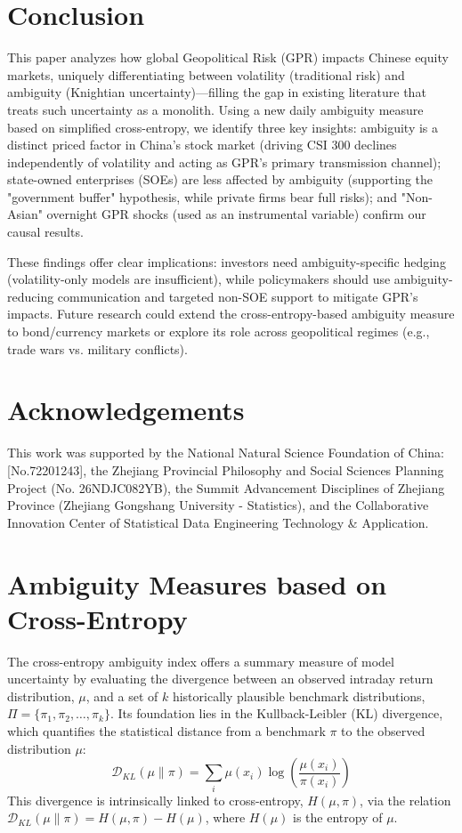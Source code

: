 \documentclass[preprint,12pt,authoryear]{elsarticle}
\begin{document}
\section{Conclusion}
\label{sec:conclusion}

This paper analyzes how global Geopolitical Risk (GPR) impacts Chinese equity markets, uniquely differentiating between volatility (traditional risk) and ambiguity (Knightian uncertainty)—filling the gap in existing literature that treats such uncertainty as a monolith. Using a new daily ambiguity measure based on simplified cross-entropy, we identify three key insights: ambiguity is a distinct priced factor in China’s stock market (driving CSI 300 declines independently of volatility and acting as GPR’s primary transmission channel); state-owned enterprises (SOEs) are less affected by ambiguity (supporting the "government buffer" hypothesis, while private firms bear full risks); and "Non-Asian" overnight GPR shocks (used as an instrumental variable) confirm our causal results.

These findings offer clear implications: investors need ambiguity-specific hedging (volatility-only models are insufficient), while policymakers should use ambiguity-reducing communication and targeted non-SOE support to mitigate GPR’s impacts. Future research could extend the cross-entropy-based ambiguity measure to bond/currency markets or explore its role across geopolitical regimes (e.g., trade wars vs. military conflicts).




\clearpage
\section*{Acknowledgements}
This work was supported by the National Natural Science Foundation of China:[No.72201243], the Zhejiang Provincial Philosophy and Social Sciences Planning Project (No. 26NDJC082YB), the Summit Advancement Disciplines of Zhejiang Province (Zhejiang Gongshang University - Statistics), and the Collaborative Innovation Center of Statistical Data Engineering Technology \& Application.

\appendix

\section{Ambiguity Measures based on Cross-Entropy}
The cross-entropy ambiguity index offers a summary measure of model uncertainty by evaluating the divergence between an observed intraday return distribution, $\mu$, and a set of $k$ historically plausible benchmark distributions, $\Pi = \{\pi_1, \pi_2, \dots, \pi_k\}$. Its foundation lies in the Kullback-Leibler (KL) divergence, which quantifies the statistical distance from a benchmark $\pi$ to the observed distribution $\mu$:
\begin{equation}
    \mathcal{D}_{KL}(\mu \| \pi) = \sum_{i} \mu(x_i) \log\left(\frac{\mu(x_i)}{\pi(x_i)}\right)
\end{equation}
This divergence is intrinsically linked to cross-entropy, $H(\mu, \pi)$, via the relation $\mathcal{D}_{KL}(\mu \| \pi) = H(\mu, \pi) - H(\mu)$, where $H(\mu)$ is the entropy of $\mu$.
\end{document}
